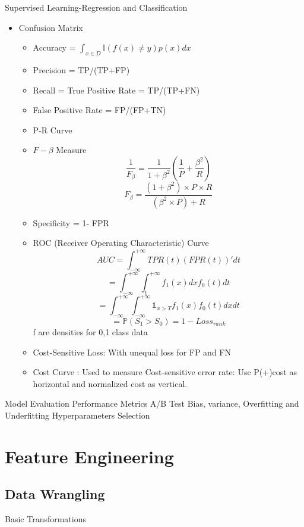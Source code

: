 \documentclass[11pt, openany]{book}              %
\begin{document}
Supervised Learning-Regression and Classification
\begin{itemize}
    \item Confusion Matrix
    \begin{itemize}
    	\item Accuracy = $\int_{x\in D} \mathbb{I}(f(x)\neq y) p(x)dx$
    	\item Precision = TP/(TP+FP)
    	\item Recall = True Positive Rate = TP/(TP+FN)
    	\item False Positive Rate = FP/(FP+TN)
    	\item P-R Curve
    	\item $F-\beta$ Measure
    	$$\frac{1}{F_{\beta}} = \frac{1}{1+\beta^2}(\frac{1}{P}+\frac{\beta^2}{R})$$
    	$${F_{\beta}} = \frac{(1+\beta^2) \times P \times R}{(\beta^2 \times P) + R}$$
    	\item Specificity = 1- FPR
    	\item ROC (Receiver Operating Characteristic) Curve
    	$$AUC = \int_{-\infty}^{+\infty}  TPR(t)(FPR(t))'dt$$
    	$$ = \int_{-\infty}^{+\infty} \int_{t}^{+\infty} f_1(x)dxf_0(t)dt$$
    	$$ = \int_{-\infty}^{+\infty}\int_{-\infty}^{+\infty} \mathbb{1}_{x>T} f_1(x) f_0(t)dxdt$$
    	$$ = \mathbb{P}(S_1 > S_0) = 1-Loss_{rank}$$ f are densities for 0,1 class data
    	\item Cost-Sensitive Loss: With unequal loss for FP and FN
    	\item Cost Curve : Used to measure Cost-sensitive error rate: Use P(+)cost as horizontal and normalized cost as vertical. 
    	
    \end{itemize}
\end{itemize}

Model Evaluation
	Performance Metrics
	A/B Test
	Bias, variance, Overfitting and Underfitting
	Hyperparameters Selection

\chapter{Feature Engineering}

\section{Data Wrangling}

Basic Transformations
\end{document}

